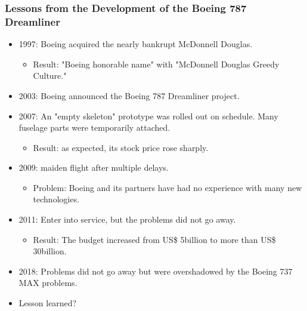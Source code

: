\documentclass[aspectratio=169, xcolor=table, notheorems, hyperref={pdfpagelabels=false}]{beamer}
\begin{document}
\begin{frame}[fragile]
\frametitle{Lessons from the Development of the Boeing 787 Dreamliner}
\begin{itemize}
\item 1997: Boeing acquired the nearly bankrupt  McDonnell Douglas.
\begin{itemize}
\item Result: "Boeing honorable name" with "McDonnell Douglas Greedy Culture."
\end{itemize}
\item 2003: Boeing announced the Boeing 787 Dreamliner project.
\item 2007: An "empty skeleton" prototype was rolled out on schedule. Many fuselage parts were temporarily attached.
\begin{itemize}
\item Result: as expected, its stock price rose sharply.
\end{itemize}
\item 2009: maiden flight after multiple delays.
\begin{itemize}
\item Problem: Boeing and its partners have had no experience with many new technologies.
\end{itemize}
\item 2011: Enter into service, but the problems did not go away.
\begin{itemize}
\item Result: The budget increased from US\$ 5billion to more than US\$ 30billion.
\end{itemize}
\item 2018: Problems did not go away but were overshadowed by the Boeing 737 MAX problems.
\item Lesson learned?
\end{itemize}
\end{frame}

\end{document}
